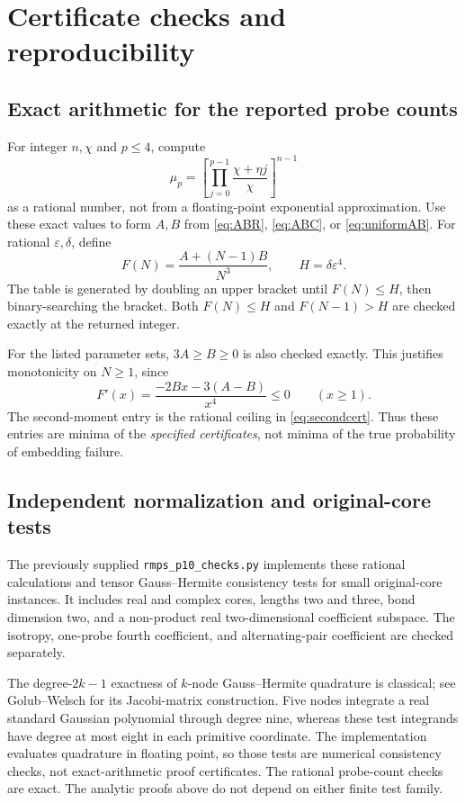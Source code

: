 \documentclass[11pt]{article}
\numberwithin{equation}{section}
\theoremstyle{definition}\newtheorem{definition}[theorem]{Definition}
\theoremstyle{remark}\newtheorem{remark}[theorem]{Remark}
\begin{document}
\section{Certificate checks and reproducibility}\label{app:checks}
\subsection{Exact arithmetic for the reported probe counts}
For integer $n,\chi$ and $p\le4$, compute
\[
 \mu_p=\left[\prod_{j=0}^{p-1}\frac{\chi+\eta j}{\chi}\right]^{n-1}
\]
as a rational number, not from a floating-point exponential approximation.
Use these exact values to form $A,B$ from \eqref{eq:ABR}, \eqref{eq:ABC}, or
\eqref{eq:uniformAB}. For rational $\varepsilon,\delta$, define
\[
 F(N)=\frac{A+(N-1)B}{N^3},\qquad H=\delta\varepsilon^4.
\]
The table is generated by doubling an upper bracket until $F(N)\le H$, then
binary-searching the bracket. Both $F(N)\le H$ and $F(N-1)>H$ are checked
exactly at the returned integer.

For the listed parameter sets, $3A\ge B\ge0$ is also checked exactly. This
justifies monotonicity on $N\ge1$, since
\[
 F'(x)=\frac{-2Bx-3(A-B)}{x^4}\le0\qquad(x\ge1).
\]
The second-moment entry is the rational ceiling in \eqref{eq:secondcert}.
Thus these entries are minima of the \emph{specified certificates}, not minima
of the true probability of embedding failure.

\subsection{Independent normalization and original-core tests}
The previously supplied \texttt{rmps\_p10\_checks.py} implements these rational
calculations and tensor Gauss--Hermite consistency tests for small original-core
instances. It includes real and complex cores, lengths two and three, bond
dimension two, and a non-product real two-dimensional coefficient subspace.
The isotropy, one-probe fourth coefficient, and alternating-pair coefficient
are checked separately.

The degree-$2k-1$ exactness of $k$-node Gauss--Hermite quadrature is classical;
see Golub--Welsch \cite{GolubWelsch} for its Jacobi-matrix construction.
Five nodes integrate a real standard Gaussian polynomial through degree nine,
whereas these test integrands have degree at most eight in each primitive
coordinate. The implementation evaluates quadrature in floating point,
so those tests are numerical consistency checks, not exact-arithmetic proof
certificates. The rational probe-count checks are exact. The analytic proofs
above do not depend on either finite test family.
\end{document}
